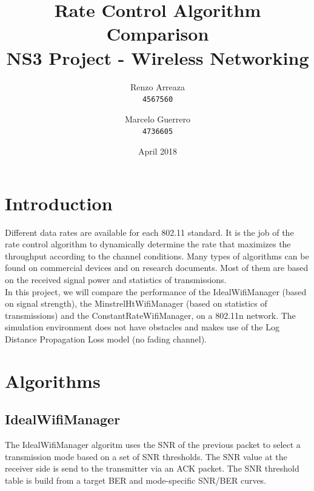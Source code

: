 \documentclass[12]{article}
\title{Rate Control Algorithm Comparison\\
        NS3 Project - Wireless Networking}
\author{
    Renzo Arreaza\\
    \texttt{4567560}
    \and
    Marcelo Guerrero\\
    \texttt{4736605}
}
\date{April 2018}
\begin{document}
\maketitle

\section{Introduction}
Different data rates are available for each 802.11 standard. It is the job of the rate control algorithm to dynamically determine the rate that maximizes the throughput according to the channel conditions. Many types of algorithms can be found on commercial devices and on research documents. Most of them are based on the received signal power and statistics of transmissions.\\

In this project, we will compare the performance of the IdealWifiManager (based on signal strength), the MinstrelHtWifiManager (based on statistics of transmissions) and the ConstantRateWifiManager, on a 802.11n network. The simulation environment does not have obstacles and makes use of the Log Distance Propagation Loss model (no fading channel).

\section{Algorithms}
\subsection{IdealWifiManager}
The IdealWifiManager algoritm uses the SNR of the previous packet to select a transmission mode based on a set of SNR thresholds. The SNR value at the receiver side is send to the transmitter via an ACK packet. The SNR threshold table is build from a target BER and mode-specific SNR/BER curves.
\end{document}
